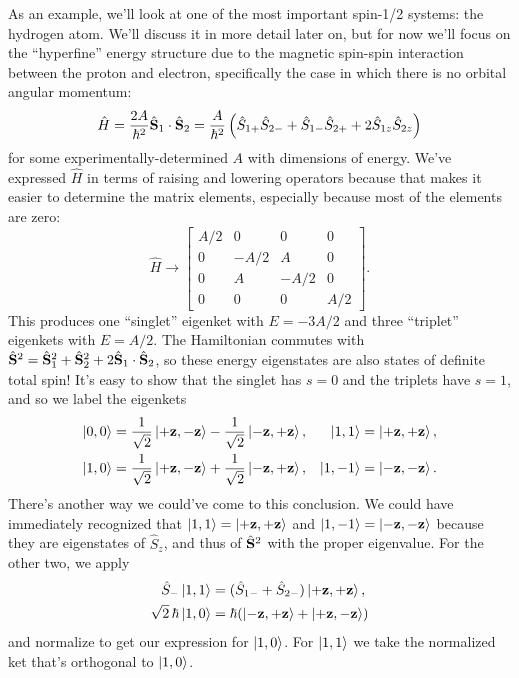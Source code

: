 \documentclass[../p116main.tex]{subfiles}
\begin{document}
As an example, we'll look at one of the most important spin-1/2 systems: the hydrogen atom.
We'll discuss it in more detail later on, but for now we'll focus on the ``hyperfine'' energy structure due to the magnetic spin-spin interaction between the proton and electron, specifically the case in which there is no orbital angular momentum:
\[ \hat H = \frac{2A}{\hbar^2} \hat{\mathbf{S}}_1 \cdot \hat{\mathbf{S}}_2 = \frac{A}{\hbar^2} \left( \hat S_{1+} \hat S_{2-} + \hat S_{1-} \hat S_{2+} + 2\hat S_{1z} \hat S_{2z} \right) \]
for some experimentally-determined $A$ with dimensions of energy.
We've expressed $\hat H$ in terms of raising and lowering operators because that makes it easier to determine the matrix elements, especially because most of the elements are zero:
\[ \hat H \longrightarrow \begin{bmatrix} A / 2 & 0 & 0 & 0 \\ 0 & -A / 2 & A & 0 \\ 0 & A & -A / 2 & 0 \\ 0 & 0 & 0 & A / 2 \end{bmatrix}. \]
This produces one ``singlet'' eigenket with $E = -3A / 2$ and three ``triplet'' eigenkets with $E = A / 2$.
The Hamiltonian commutes with $\hat{\mathbf{S}}^2 = \hat{\mathbf{S}}_1^2 + \hat{\mathbf{S}}_2^2 + 2 \hat{\mathbf{S}}_1 \cdot \hat{\mathbf{S}}_2$, so these energy eigenstates are also states of definite total spin!
It's easy to show that the singlet has $s=0$ and the triplets have $s=1$, and so we label the eigenkets     \vspace{-6pt}
\begin{align*}
    \left| 0,0 \right> &= \frac{1}{\sqrt{2}} \left| +\mathbf{z}, -\mathbf{z} \right> - \frac{1}{\sqrt{2}} \left| -\mathbf{z}, +\mathbf{z} \right>, & \left| 1,1 \right> &= \left| +\mathbf{z}, +\mathbf{z} \right>, \\
    \left| 1,0 \right> &= \frac{1}{\sqrt{2}} \left| +\mathbf{z}, -\mathbf{z} \right> + \frac{1}{\sqrt{2}} \left| -\mathbf{z}, +\mathbf{z} \right>, & \left| 1,-1 \right> &= \left| -\mathbf{z}, -\mathbf{z} \right>.
\end{align*}
There's another way we could've come to this conclusion.
We could have immediately recognized that $\left| 1,1 \right> = \left| +\mathbf{z}, +\mathbf{z} \right>$ and $\left| 1,-1 \right> = \left| -\mathbf{z}, -\mathbf{z} \right>$ because they are eigenstates of $\hat S_z$, and thus of $\hat{\mathbf{S}}^2$ with the proper eigenvalue.
For the other two, we apply
\begin{align*}
    \hat S_- \left| 1,1 \right> &= (\hat S_{1-} + \hat S_{2-}) \left| +\mathbf{z}, +\mathbf{z} \right>, \\
    \sqrt{2} \,\hbar \left| 1,0 \right> &= \hbar (\left| -\mathbf{z}, +\mathbf{z} \right> + \left| +\mathbf{z}, -\mathbf{z} \right>)
\end{align*}
and normalize to get our expression for $\left| 1,0 \right>$.
For $\left| 1,1 \right>$ we take the normalized ket that's orthogonal to $\left| 1,0 \right>$.
\end{document}
